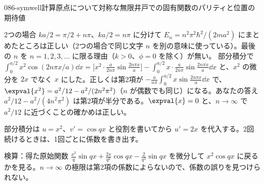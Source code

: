 \documentclass[uplatex,dvipdfmx,a4paper,11pt]{jsarticle}
\begin{document}
\begin{mondai}{086-symwell}{計算}{原点について対称な無限井戸での固有関数のパリティと位置の期待値}
\begin{kotaeran}
   2つの場合 $ka/2=\pi/2+n\pi$、$ka/2=n\pi$ に分けて $E_{n}=n^{2}\pi^{2}\hbar^{2}/(2ma^{2})$ にまとめたところは正しい（2つの場合で同じ文字 $n$ を別の意味に使っている）。最後の $n$ を $n=1,2,3,\dots$ に限る理由（$k>0$、$\phi=0$ を除く）が無い。
   部分積分で $\int_{0}^{a/2}x^{2}\cos(2n\pi x/a)\dd x=\bigl[x^{2}\cdot\frac{a}{2n\pi}\sin\frac{2n\pi x}{a}\bigr]-\int_{0}^{a/2}x\cdot\frac{a}{2n\pi}\sin\frac{2n\pi x}{a}\dd x$ と、$x^{2}$ の微分を $2x$ でなく $x$ にした。正しくは第2項が $-\frac{a}{n\pi}\int_{0}^{a/2}x\sin\frac{2n\pi x}{a}\dd x$ で、$\expval{x^{2}}=a^{2}/12-a^{2}/(2n^{2}\pi^{2})$（$n$ が偶数でも同じ）になる。あなたの答え $a^{2}/12-a^{2}/(4n^{2}\pi^{2})$ は第2項が半分である。$\expval{x}=0$ と、$n\to\infty$ で $a^{2}/12$ に近づくことの確かめは正しい。
\end{kotaeran}
\begin{rikai}
  \item 部分積分は $u=x^{2}$、$v'=\cos qx$ と役割を書いてから $u'=2x$ を代入する。2回続けるときは、1回ごとに係数を書き出す。
  \item 検算：得た原始関数 $\frac{x^{2}}{q}\sin qx+\frac{2x}{q^{2}}\cos qx-\frac{2}{q^{3}}\sin qx$ を微分して $x^{2}\cos qx$ に戻るかを見る。$n\to\infty$ の極限は第2項の係数によらないので、係数の誤りを見つけられない。
\end{rikai}
\end{mondai}
\end{document}

